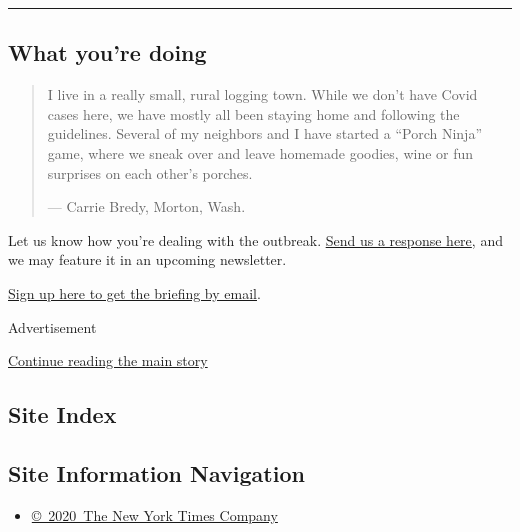 \begin{center}\rule{0.5\linewidth}{\linethickness}\end{center}

\hypertarget{what-youre-doing}{%
\subsection{What you're doing}\label{what-youre-doing}}

\begin{quote}
I live in a really small, rural logging town. While we don't have Covid
cases here, we have mostly all been staying home and following the
guidelines. Several of my neighbors and I have started a ``Porch Ninja''
game, where we sneak over and leave homemade goodies, wine or fun
surprises on each other's porches.

--- Carrie Bredy, Morton, Wash.
\end{quote}

Let us know how you're dealing with the outbreak.
\href{https://www.nytimes3xbfgragh.onion/2020/03/02/reader-center/coronavirus-preparation.html}{Send
us a response here}, and we may feature it in an upcoming newsletter.

\href{https://www.nytimes3xbfgragh.onion/newsletters/coronavirus-briefing}{Sign
up here to get the briefing by email}.

Advertisement

\protect\hyperlink{after-bottom}{Continue reading the main story}

\hypertarget{site-index}{%
\subsection{Site Index}\label{site-index}}

\hypertarget{site-information-navigation}{%
\subsection{Site Information
Navigation}\label{site-information-navigation}}

\begin{itemize}
\tightlist
\item
  \href{https://help.nytimes3xbfgragh.onion/hc/en-us/articles/115014792127-Copyright-notice}{©~2020~The
  New York Times Company}
\end{itemize}

